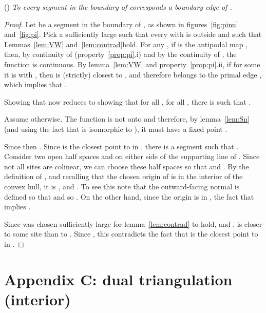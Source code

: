 \documentclass[11pt]{article}
\begin{document}
()
\emph{
To every segment  in the boundary of  corresponds a boundary edge of .  
}
\begin{proof}  
Let  be a segment in the boundary of , 
	as shown in figures~\ref{fig:pinu} and~\ref{fig:pi}. 
Pick a sufficiently large  such that every  with
 is outside  and such that 
	Lemmas~\ref{lem:VW} and~\ref{lem:contrad}hold. 
For any , if  is the antipodal map , 
then, by continuity of  (property~\ref{prop:pi}.i) and by the continuity of , the function  is
continuous. 
By lemma~\ref{lem:VW} and property~\ref{prop:pi}.ii, 
	if for some  it is 
 with
, then  is (strictly) closest to
, and therefore belongs to the primal edge , which implies
that . 

Showing that  now reduces to showing that for all 
, for all , there is  such that
. 

Assume otherwise. The function 
 is not onto and therefore, 
by lemma~\ref{lem:Sn} (and using the fact that  is isomorphic to ), 
it must have a fixed point . 

Since  then . 
Since  is the closest point to  in , 
	there is a segment  such that
. Consider two open half spaces
 and  on either side of the supporting line of
. Since not all sites are colinear, we can choose these half spaces so that 
 and . 
By the definition of , and recalling that the chosen origin of
 is in the interior  of the convex hull, 
it is , and . 
To see this note that the outward-facing normal  is defined so that
 and so .
On the other hand, since the origin is in
, the fact that  
implies . 

Since  was chosen sufficiently large for lemma~\ref{lem:contrad} to
hold, and ,  is closer to some site  than to . 
Since , this contradicts the fact
that  is the closest point to  in
. \end{proof}





\section*{Appendix C: dual triangulation (interior)}\label{app:interior}
\end{document}
